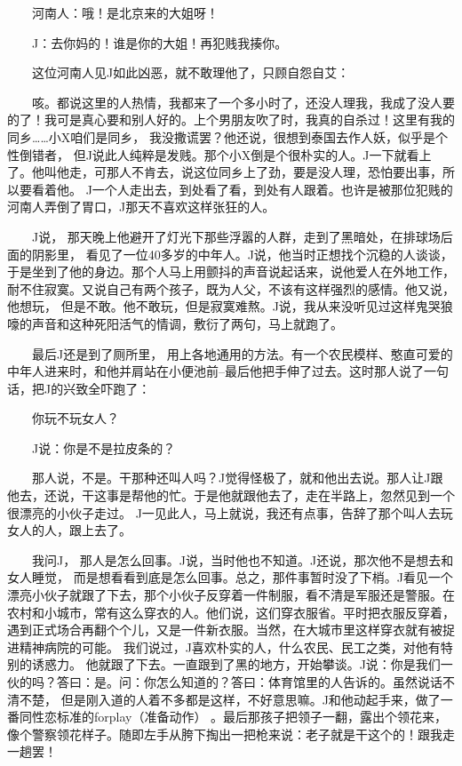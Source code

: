  　　河南人：哦！是北京来的大姐呀！ 
 
 　　J：去你妈的！谁是你的大姐！再犯贱我揍你。 
 
 　　这位河南人见J如此凶恶，就不敢理他了，只顾自怨自艾： 
 
 　　咳。都说这里的人热情，我都来了一个多小时了，还没人理我，我成了没人要的了！我可是真心要和别人好的。上个男朋友吹了时，我真的自杀过！这里有我的同乡……小X咱们是同乡， 我没撒谎罢？他还说，很想到泰国去作人妖，似乎是个性倒错者， 但J说此人纯粹是发贱。那个小X倒是个很朴实的人。J一下就看上了。他叫他走，可那人不肯去，说这位同乡上了劲，要是没人理，恐怕要出事，所以要看着他。 J一个人走出去，到处看了看，到处有人跟着。也许是被那位犯贱的河南人弄倒了胃口，J那天不喜欢这样张狂的人。 
 
 　　J说， 那天晚上他避开了灯光下那些浮嚣的人群，走到了黑暗处，在排球场后面的阴影里， 看见了一位40多岁的中年人。J说，他当时正想找个沉稳的人谈谈，于是坐到了他的身边。那个人马上用颤抖的声音说起话来，说他爱人在外地工作，耐不住寂寞。又说自己有两个孩子，既为人父，不该有这样强烈的感情。他又说，他想玩， 但是不敢。他不敢玩，但是寂寞难熬。J说，我从来没听见过这样鬼哭狼嚎的声音和这种死阳活气的情调，敷衍了两句，马上就跑了。 
 
 　　最后J还是到了厕所里， 用上各地通用的方法。有一个农民模样、憨直可爱的中年人进来时，和他并肩站在小便池前--最后他把手伸了过去。这时那人说了一句话，把J的兴致全吓跑了： 
 
 　　你玩不玩女人？ 
 
 　　J说：你是不是拉皮条的？ 
 
 　　那人说，不是。干那种还叫人吗？J觉得怪极了，就和他出去说。那人让J跟他去，还说，干这事是帮他的忙。于是他就跟他去了，走在半路上，忽然见到一个很漂亮的小伙子走过。 J一见此人，马上就说，我还有点事，告辞了那个叫人去玩女人的人，跟上去了。 
 
 　　我问J， 那人是怎么回事。J说，当时他也不知道。J还说，那次他不是想去和女人睡觉， 而是想看看到底是怎么回事。总之，那件事暂时没了下梢。J看见一个漂亮小伙子就跟了下去，那个小伙子反穿着一件制服，看不清是军服还是警服。在农村和小城市，常有这么穿衣的人。他们说，这们穿衣服省。平时把衣服反穿着，遇到正式场合再翻个个儿，又是一件新衣服。当然，在大城市里这样穿衣就有被捉进精神病院的可能。 我们说过，J喜欢朴实的人，什么农民、民工之类，对他有特别的诱惑力。 他就跟了下去。一直跟到了黑的地方，开始攀谈。J说：你是我们一伙的吗？答曰：是。问：你怎么知道的？答曰：体育馆里的人告诉的。虽然说话不清不楚， 但是刚入道的人着不多都是这样，不好意思嘛。J和他动起手来，做了一番同性恋标准的forplay（准备动作） 。最后那孩子把领子一翻，露出个领花来，像个警察领花样子。随即左手从胯下掏出一把枪来说：老子就是干这个的！跟我走一趟罢！ 
 
